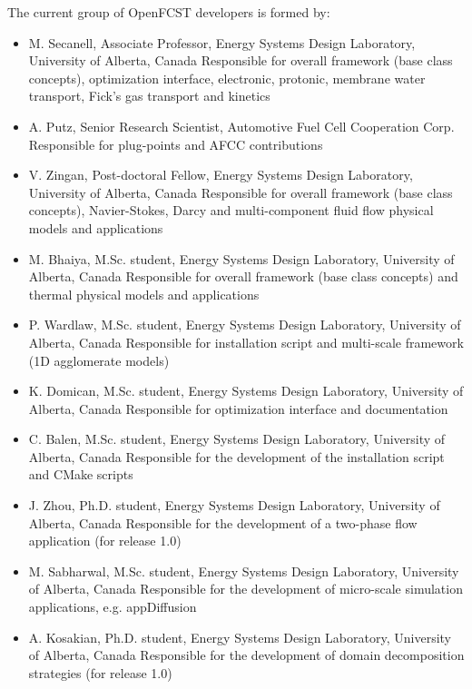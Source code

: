The current group of OpenFCST developers is formed by:
\begin{itemize}
 \item M. Secanell, Associate Professor, Energy Systems Design Laboratory, University of Alberta, Canada 
   \subitem Responsible for overall framework (base class concepts), optimization interface, electronic, protonic, membrane water transport, Fick's gas transport and kinetics
 \item A. Putz, Senior Research Scientist, Automotive Fuel Cell Cooperation Corp. 
   \subitem Responsible for plug-points and AFCC contributions
 \item V. Zingan, Post-doctoral Fellow, Energy Systems Design Laboratory, University of Alberta, Canada 
   \subitem Responsible for overall framework (base class concepts), Navier-Stokes, Darcy and multi-component fluid flow physical models and applications
 \item M. Bhaiya, M.Sc. student, Energy Systems Design Laboratory, University of Alberta, Canada 
   \subitem Responsible for overall framework (base class concepts) and thermal physical models and applications
 \item P. Wardlaw, M.Sc. student, Energy Systems Design Laboratory, University of Alberta, Canada 
   \subitem Responsible for installation script and multi-scale framework (1D agglomerate models)
 \item K. Domican, M.Sc. student, Energy Systems Design Laboratory, University of Alberta, Canada 
   \subitem Responsible for optimization interface and documentation
 \item C. Balen, M.Sc. student, Energy Systems Design Laboratory, University of Alberta, Canada 
   \subitem Responsible for the development of the installation script and CMake scripts
 \item J. Zhou, Ph.D. student, Energy Systems Design Laboratory, University of Alberta, Canada 
   \subitem Responsible for the development of a two-phase flow application (for release 1.0)
 \item M. Sabharwal, M.Sc. student, Energy Systems Design Laboratory, University of Alberta, Canada 
   \subitem Responsible for the development of micro-scale simulation applications, e.g. appDiffusion
 \item A. Kosakian, Ph.D. student, Energy Systems Design Laboratory, University of Alberta, Canada 
   \subitem Responsible for the development of domain decomposition strategies (for release 1.0)
\end{itemize}
